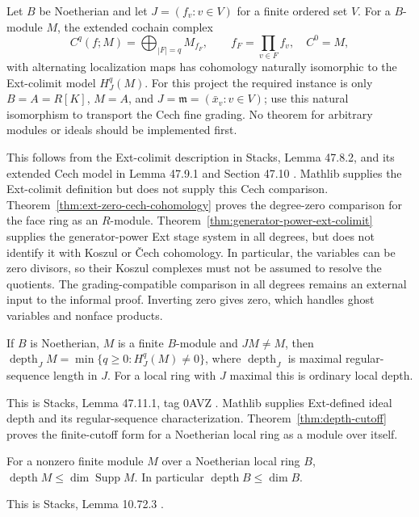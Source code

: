 \begin{theorem}\label{found:cech}
Let $B$ be Noetherian and let $J=(f_v:v\in V)$ for a finite ordered set
$V$. For a $B$-module $M$, the extended cochain complex
\[
 C^q(f;M)=\bigoplus_{|F|=q}M_{f_F},\qquad f_F=\prod_{v\in F}f_v,
 \quad C^0=M,
\]
with alternating localization maps has cohomology naturally isomorphic to
the Ext-colimit model $H^q_J(M)$. For this project the required instance
is only $B=A=R[K]$, $M=A$, and $J=\mathfrak m=(\bar x_v:v\in V)$; use
this natural isomorphism to transport the Cech fine grading. No theorem
for arbitrary modules or ideals should be implemented first.
\end{theorem}
This follows from the Ext-colimit description in Stacks, Lemma 47.8.2,
and its extended Cech model in Lemma 47.9.1 and Section 47.10
\cite{stacks-cech}. Mathlib supplies the Ext-colimit definition but does
not supply this Cech comparison. Theorem~\ref{thm:ext-zero-cech-cohomology}
proves the degree-zero comparison for the face ring as an $R$-module.
Theorem~\ref{thm:generator-power-ext-colimit} supplies the generator-power
Ext stage system in all degrees, but does not identify it with Koszul
or Čech cohomology. In particular, the variables can be zero divisors,
so their Koszul complexes must not be assumed to resolve the quotients.
The grading-compatible comparison in all degrees remains an external
input to the informal proof. Inverting zero gives zero, which handles
ghost variables and nonface products.

\begin{theorem}\label{found:depth}
If $B$ is Noetherian, $M$ is a finite $B$-module and $JM\ne M$, then
$\operatorname{depth}_J M=\min\{q\ge0:H^q_J(M)\ne0\}$, where
$\operatorname{depth}_J$ is maximal regular-sequence length in $J$.
For a local ring with $J$ maximal this is ordinary local depth.
\end{theorem}
This is Stacks, Lemma 47.11.1, tag 0AVZ \cite{stacks-depth}.
Mathlib supplies Ext-defined ideal depth and its regular-sequence
characterization. Theorem~\ref{thm:depth-cutoff} proves the finite-cutoff
form for a Noetherian local ring as a module over itself.

\begin{theorem}\label{found:depth-bound}
For a nonzero finite module $M$ over a Noetherian local ring $B$,
$\operatorname{depth} M\le\dim\operatorname{Supp} M$.
In particular $\operatorname{depth} B\le\dim B$.
\end{theorem}
This is Stacks, Lemma 10.72.3 \cite{stacks-depth-def}.

